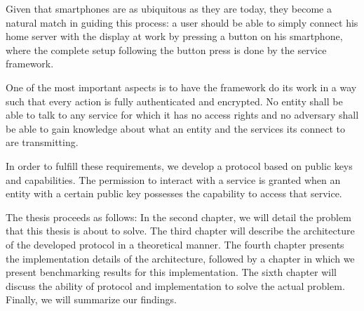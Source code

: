 Given that smartphones are as ubiquitous as they are today, they become a natural match in guiding this process:
a user should be able to simply connect his home server with the display at work by pressing a button on his smartphone, where the complete setup following the button press is done by the service framework.

One of the most important aspects is to have the framework do its work in a way such that every action is fully authenticated and encrypted.
No entity shall be able to talk to any service for which it has no access rights and no adversary shall be able to gain knowledge about what an entity and the services its connect to are transmitting.

In order to fulfill these requirements, we develop a protocol based on public keys and capabilities.
The permission to interact with a service is granted when an entity with a certain public key possesses the capability to access that service.

\bigskip

The thesis proceeds as follows:
In the second chapter, we will detail the problem that this thesis is about to solve.
The third chapter will describe the architecture of the developed protocol in a theoretical manner.
The fourth chapter presents the implementation details of the architecture, followed by a chapter in which we present benchmarking results for this implementation.
The sixth chapter will discuss the ability of protocol and implementation to solve the actual problem.
Finally, we will summarize our findings.


